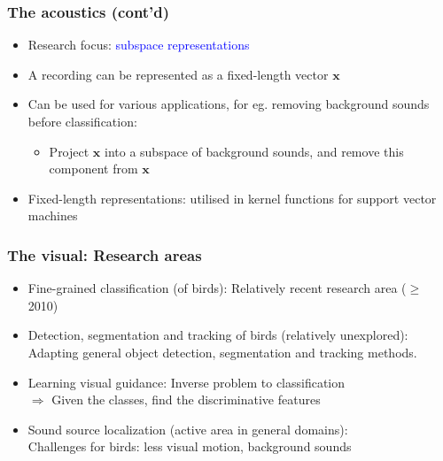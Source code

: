\documentclass[mathserif]{beamer}
\begin{document}
\begin{frame}
\frametitle{The acoustics (cont'd)}
\begin{itemize}
\item<2-> Research focus: \textcolor{blue}{subspace representations} 
\item<3-> A recording can be represented as a fixed-length vector $\mathbf{x}$ 
\item<4-> Can be used for various applications, for eg. removing background
sounds before classification:
\begin{itemize}
	\item<5-> Project $\mathbf{x}$ into a subspace of background sounds, and remove this
	component from $\mathbf{x}$
\end{itemize}
\item <6-> Fixed-length representations: utilised in kernel functions for
support vector machines
\end{itemize}
\end{frame}


\begin{frame}
\frametitle{The visual: Research areas}
\begin{itemize}
\item<2-> Fine-grained classification (of birds): Relatively recent research area ($\geq$ 2010)
\item<3-> Detection, segmentation and tracking of birds (relatively unexplored): \\Adapting general object detection, segmentation and tracking methods.
\item<4-> Learning visual guidance: Inverse problem to classification \\$\Rightarrow$ Given the classes, find the discriminative features
\item<5-> Sound source localization (active area in general domains): \\Challenges for birds: less visual motion, background sounds
\end{itemize}
\end{frame}
\end{document}

